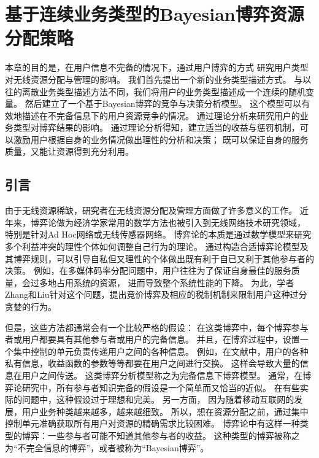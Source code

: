 \graphicspath{ {../body/bayesian_figures/}}
\chapter{基于连续业务类型的Bayesian博弈资源分配策略}
\par 
本章的目的是，在用户信息不完备的情况下，通过用户博弈的方式
研究用户类型对无线资源分配与管理的影响。
我们首先提出一个新的业务类型描述方式。
与以往的离散业务类型描述方法不同，我们将用户的业务类型描述成一个连续的随机变量。
然后建立了一个基于Bayesian博弈的竞争与决策分析模型。
这个模型可以有效地描述在不完备信息下的用户资源竞争的情况。
通过理论分析来研究用户的业务类型对博弈结果的影响。
通过理论分析得知，建立适当的收益与惩罚机制，可以激励用户根据自身的业务情况做出理性的分析和决策；
既可以保证自身的服务质量，又能让资源得到充分利用。
%
\section{引言}
由于无线资源稀缺，研究者在无线资源分配及管理方面做了许多意义的工作。
近年来，博弈论做为经济学家常用的数学方法也被引入到无线网络技术研究领域，
特别是针对Ad Hoc网络或无线传感器网络\cite{Srivastava:2005}\cite{FangBensaou2004}。
博弈论的本质是通过数学模型来研究多个利益冲突的理性个体如何调整自己行为的理论。
通过构造合适博弈论模型及其博弈规则，可以引导自私但又理性的个体做出既有利于自已又利于其他参与者的决策。
例如，在多媒体码率分配问题中，用户往往为了保证自身最佳的服务质量，会过多地占用系统的资源，
进而导致整个系统性能的下降。
为此，学者Zhang和Liu针对这个问题，提出竞价博弈及相应的税制机制来限制用户这种过分贪婪的行为\cite{ZhangLiu2011}。

但是，这些方法都通常会有一个比较严格的假设：
在这类博弈中，每个博弈参与者或用户都要具有其他参与者或用户的完备信息。
并且，在博弈过程中，设置一个集中控制的单元负责传递用户之间的各种信息。
例如，在文献\cite{ZhangLiu2011}中，用户的各种私有信息，收益函数的参数等等都要在用户之间进行交换。
这样会导致大量的信息在用户之间传送。
这类博弈分析模型称之为完备信息下博弈模型。
通常，在博弈论研究中，所有参与者知识完备的假设是一个简单而又恰当的近似。
在有些实际的问题中，这种假设过于理想和完美。
另一方面，
因为随着移动互联网的发展，用户业务种类越来越多，越来越细致。
所以，想在资源分配之前，通过集中控制单元准确获取所有用户对资源的精确需求比较困难。
博弈论中有这样一种类型的博弈：一些参与者可能不知道其他参与者的收益。
这种类型的博弈被称之为“不完全信息的博弈”，或者被称为“Bayesian博弈”。

